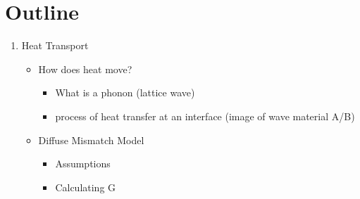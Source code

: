 \section{Outline}
\begin{enumerate}
\item Heat Transport
	\begin{itemize}
    \item How does heat move?
    	\begin{itemize}
    	\item What is a phonon (lattice wave)
        \item process of heat transfer at an interface (image of wave material A/B)
    	\end{itemize}
	\item Diffuse Mismatch Model
    	\begin{itemize}
    	\item Assumptions
        \item Calculating G


\end{itemize}
\end{itemize}
\end{enumerate}
